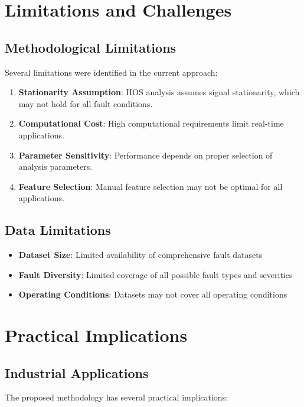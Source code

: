 \section{Limitations and Challenges}

\subsection{Methodological Limitations}

Several limitations were identified in the current approach:

\begin{enumerate}
    \item \textbf{Stationarity Assumption}: HOS analysis assumes signal stationarity, which may not hold for all fault conditions.
    \item \textbf{Computational Cost}: High computational requirements limit real-time applications.
    \item \textbf{Parameter Sensitivity}: Performance depends on proper selection of analysis parameters.
    \item \textbf{Feature Selection}: Manual feature selection may not be optimal for all applications.
\end{enumerate}

\subsection{Data Limitations}

\begin{itemize}
    \item \textbf{Dataset Size}: Limited availability of comprehensive fault datasets
    \item \textbf{Fault Diversity}: Limited coverage of all possible fault types and severities
    \item \textbf{Operating Conditions}: Datasets may not cover all operating conditions
\end{itemize}

\section{Practical Implications}

\subsection{Industrial Applications}

The proposed methodology has several practical implications:

